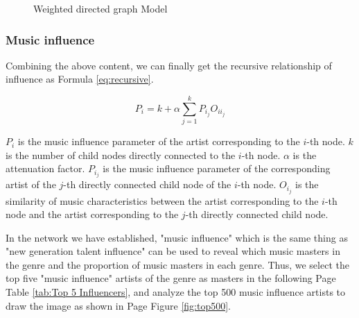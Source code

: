 \documentclass[12pt]{article}  %
\begin{document}
\begin{figure}[htbp]
\centering
{}
\caption{Weighted directed graph Model}\label{fig:fixed networkstructure}
\end{figure}

\subsubsection{Music influence}

Combining the above content, we can finally get the recursive relationship of influence as Formula \ref{eq:recursive}.

\begin{equation}\label{eq:recursive}
    P_i = k+\alpha \sum_{j=1}^{k}P_{i_j}O_{i{i_j}}
\end{equation}

$P_i$ is the music influence parameter of the artist corresponding to the $i$-th node. $k$ is the number of child nodes directly connected to the $i$-th node. $\alpha$ is the attenuation factor. $P_{i_j}$ is the music influence parameter of the corresponding artist of the $j$-th directly connected child node of the $i$-th node. $O_{i_j}$ is the similarity of music characteristics between the artist corresponding to the $i$-th node and the artist corresponding to the $j$-th directly connected child node. \par


In the network we have established, "music influence" which is the same thing as "new generation talent influence" can be used to reveal which music masters in the genre and the proportion of music masters in each genre. Thus, we select the top five "music influence" artists of the genre as masters in the following Page \pageref{tab:Top 5 Influencers} Table \ref{tab:Top 5 Influencers}, and analyze the top 500 music influence artists to draw the image as shown in Page \pageref{fig:top500} Figure \ref{fig:top500}.
\end{document}
